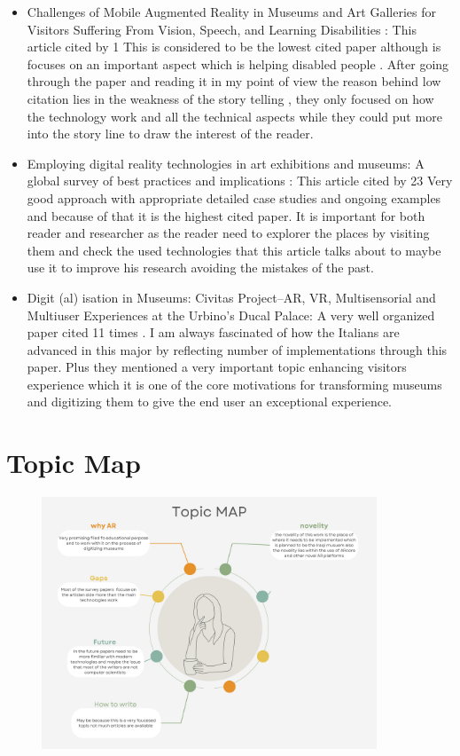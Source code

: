 \documentclass{article}
\begin{document}
\begin{itemize}
    \item Challenges of Mobile Augmented Reality in Museums and Art Galleries for Visitors Suffering From Vision, Speech, and Learning Disabilities\cite{kunjir2020challenges} :
    \newline
    This article  cited by 1 
    This is considered to be the lowest cited paper although is focuses on an important aspect which is helping disabled people .
    After going through the paper and reading it in my point of view the reason behind low citation lies in the weakness of the story telling , they only focused on how the technology work and all the technical aspects while they could put more into the story line to draw the interest of the reader.
    \item Employing digital reality technologies in art exhibitions and museums: A global survey of best practices and implications
    \cite{kang2020employing}:
    \newline
        This article cited by 23 
        Very good approach with appropriate detailed case studies and ongoing examples and because of that it is the highest cited paper.
        It is important for both reader and researcher as the reader need to explorer the places by visiting them and check the used technologies that this article talks about to maybe use it to improve his research avoiding the mistakes of the past.
    \item Digit (al) isation in Museums: Civitas Project--AR, VR, Multisensorial and Multiuser Experiences at the Urbino's Ducal Palace\cite{clini2020digit}:
    \newline
    A very well organized paper cited 11 times .
    I am always fascinated of how the Italians are advanced in this major by reflecting number of implementations through this paper.
    Plus they mentioned a very important topic enhancing visitors experience which it is one of the core motivations for transforming museums and digitizing them to give the end user an exceptional experience.
    
\end{itemize}

\newpage
\section{Topic Map}
\begin{figure}[h!]
\centering
\includegraphics[width=100mm]{Topic MAP.jpg}

\label{fig:method}
\end{figure}
\medskip




\end{document}
